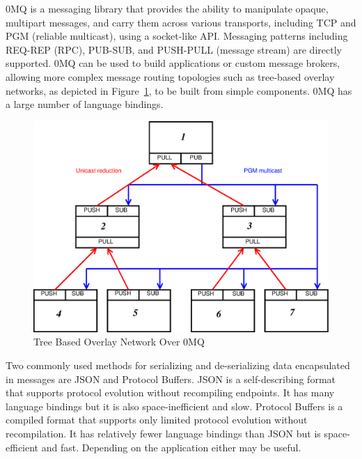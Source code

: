 0MQ\cite{ZMQGuide} is a messaging library that
provides the ability to manipulate opaque, multipart messages, and
carry them across various transports, including TCP and PGM\cite{rfc3208}
(reliable multicast), using a socket-like API.  Messaging patterns
including REQ-REP (RPC), PUB-SUB, and PUSH-PULL (message stream)
are directly supported.
0MQ can be used to build applications or custom message brokers,
allowing more complex message routing topologies such as tree-based
overlay networks, as depicted in Figure~\ref{FigZmqTBON}, to be built
from simple components.  0MQ has a large number of language bindings.

\begin{figure}
\centering
\includegraphics[scale=0.35]{../fig/zmqtbon.eps}
\caption{Tree Based Overlay Network Over 0MQ}
\label{FigZmqTBON}
\end{figure}

Two commonly used methods for serializing and de-serializing data
encapsulated in messages are
JSON\cite{rfc4627} 
and Protocol Buffers\cite{Protobuf}.
JSON is a self-describing format
that supports protocol evolution without recompiling endpoints.  It has
many language bindings but it is also space-inefficient and slow.
Protocol Buffers is a compiled format that supports
only limited protocol evolution without recompilation.  It has relatively
fewer language bindings than JSON but is space-efficient and fast.
Depending on the application either may be useful.

